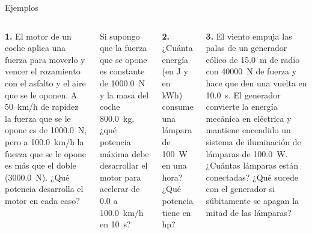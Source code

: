 \documentclass[9pt, aspectratio=169]{beamer}
\begin{document}
\begin{frame}{Ejemplos}
    \begin{columns}[t]
\cx
\textbf{1.} El motor de un coche aplica una fuerza para moverlo y vencer el rozamiento con el asfalto y el aire que se le oponen. A \qty{50}{km/h} de rapidez la fuerza que se le opone es de \qty{1000.0}{N}, pero a \qty{100.0}{km/h} la fuerza que se le opone es más que el doble (\qty{3000.0}{N}). ¿Qué potencia desarrolla el motor en cada caso?

Si supongo que la fuerza que se opone es constante  de \qty{1000.0}{N} y la masa del coche \qty{800.0}{kg}, ¿qué potencia máxima debe desarrollar el motor para acelerar de \num{0.0} a \qty{100.0}{km/h} en \qty{10}{s}?

\cx
\textbf{2.} ¿Cuánta energía (en \unit{J} y en \unit{kWh}) consume una lámpara de \qty{100}{W} en una hora? ¿Qué potencia tiene en \unit{hp}?

\textbf{3.} El viento empuja las palas de un generador eólico de \qty{15.0}{m} de radio con \qty{40000}{N} de fuerza y hace que den una vuelta en \qty{10.0}{s}. El generador convierte la energía mecánica en eléctrica y mantiene encendido un sistema de iluminación de lámparas de \qty{100.0}{W}. ¿Cuántas lámparas están conectadas? ¿Qué sucede con el generador si súbitamente se apagan la mitad de las lámparas?

\end{columns}
\end{frame}
\end{document}

